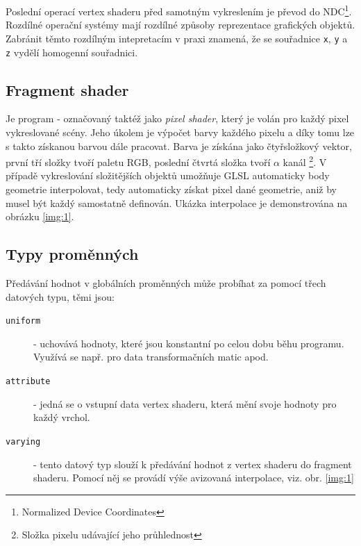 Poslední operací vertex shaderu před samotným vykreslením je převod do NDC\footnote{Normalized Device Coordinates}. Rozdílné operační systémy mají rozdílné způsoby reprezentace grafických objektů. Zabránit těmto rozdílným  intepretacím v praxi znamená, že se souřadnice \texttt{x}, \texttt{y} a \texttt{z} vydělí homogenní souřadnici.

\subsection{Fragment shader}
Je program - označovaný taktéž jako \textit{pixel shader}, který je volán pro každý pixel vykreslované scény. Jeho úkolem je výpočet barvy každého pixelu a díky tomu lze s takto získanou barvou  dále pracovat. Barva je získána jako čtyřsložkový vektor, první tří složky tvoří paletu RGB, poslední čtvrtá složka tvoří $\alpha$ kanál \footnote{Složka pixelu udávající jeho průhlednost}. V případě vykreslování složitějších objektů umožňuje GLSL automaticky body geometrie interpolovat, tedy automaticky získat pixel dané geometrie, aniž by musel být každý samostatně definován. Ukázka interpolace je demonstrována na obrázku \ref{img:1}.

\newpage


\subsection{Typy proměnných}
Předávání hodnot v globálních proměnných může probíhat za pomocí třech datových typu, těmi jsou:
\begin{description}
	\item[\texttt{uniform}]  
	- uchovává hodnoty, které jsou konstantní po celou dobu běhu programu. Využívá se např. pro data transformačních matic apod.	
	\item[\texttt{attribute}] 
	- 	jedná se o vstupní data vertex shaderu, která mění svoje hodnoty pro každý vrchol. 
	\item[\texttt{varying}] 
	- tento datový typ slouží k předávání hodnot z vertex shaderu do fragment shaderu. Pomocí něj se provádí výše avizovaná interpolace, viz. obr. \ref{img:1} 

\end{description}



